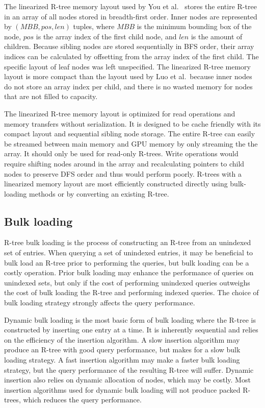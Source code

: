 The linearized R-tree memory layout used by You et al.~\cite{you2013parallel} stores the entire R-tree in an array of all nodes stored in breadth-first order. Inner nodes are represented by \((MBB, pos, len)\) tuples, where \(MBB\) is the minimum bounding box of the node, \(pos\) is the array index of the first child node, and \(len\) is the amount of children. Because sibling nodes are stored sequentially in BFS order, their array indices can be calculated by offsetting from the array index of the first child. The specific layout of leaf nodes was left unspecified. The linearized R-tree memory layout is more compact than the layout used by Luo et al.~because inner nodes do not store an array index per child, and there is no wasted memory for nodes that are not filled to capacity.

The linearized R-tree memory layout is optimized for read operations and memory transfers without serialization. It is designed to be cache friendly with its compact layout and sequential sibling node storage. The entire R-tree can easily be streamed between main memory and GPU memory by only streaming the the array. It should only be used for read-only R-trees. Write operations would require shifting nodes around in the array and recalculating pointers to child nodes to preserve DFS order and thus would perform poorly. R-trees with a linearized memory layout are most efficiently constructed directly using bulk-loading methods or by converting an existing R-tree.

\subsection{Bulk loading}

R-tree bulk loading is the process of constructing an R-tree from an unindexed set of entries. When querying a set of unindexed entries, it may be beneficial to bulk load an R-tree prior to performing the queries, but bulk loading can be a costly operation. Prior bulk loading may enhance the performance of queries on unindexed sets, but only if the cost of performing unindexed queries outweighs the cost of bulk loading the R-tree and performing indexed queries. The choice of bulk loading strategy strongly affects the query performance.

Dynamic bulk loading is the most basic form of bulk loading where the R-tree is constructed by inserting one entry at a time. It is inherently sequential and relies on the efficiency of the insertion algorithm. A slow insertion algorithm may produce an R-tree with good query performance, but makes for a slow bulk loading strategy. A fast insertion algorithm may make a faster bulk loading strategy, but the query performance of the resulting R-tree will suffer. Dynamic insertion also relies on dynamic allocation of nodes, which may be costly. Most insertion algorithms used for dynamic bulk loading will not produce packed R-trees, which reduces the query performance.

